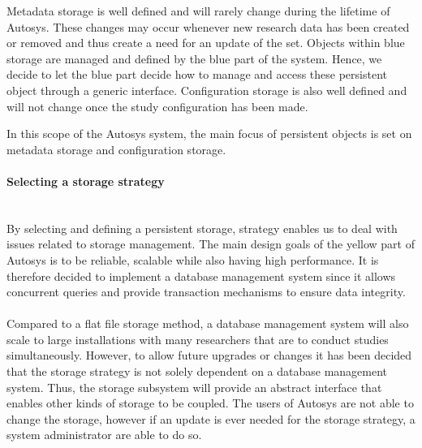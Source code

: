 Metadata storage is well defined and will rarely change during the lifetime of Autosys. These changes may occur whenever new research data has been created or removed and thus create a need for an update of the set. Objects within blue storage are managed and defined by the blue part of the system. Hence, we decide to let the blue part decide how to manage and access these persistent object through a generic interface. Configuration storage is also well defined and will not change once the study configuration has been made.

In this scope of the Autosys system, the main focus of persistent objects is set on metadata storage and configuration storage.

\paragraph{Selecting a storage strategy}\mbox{}\\
By selecting and defining a persistent storage, strategy enables us to deal with issues related to storage management. The main design goals of the yellow part of Autosys is to be reliable, scalable while also having high performance. It is therefore decided to implement a database management system since it allows concurrent queries and provide transaction mechanisms to ensure data integrity. \\\\Compared to a flat file storage method, a database management system will also scale to large installations with many researchers that are to conduct studies simultaneously. However, to allow future upgrades or changes it has been decided that the storage strategy is not solely dependent on a database management system. Thus, the storage subsystem will provide an abstract interface that enables other kinds of storage to be coupled. The users of Autosys are not able to change the storage, however if an update is ever needed for the storage strategy, a system administrator are able to do so. 

